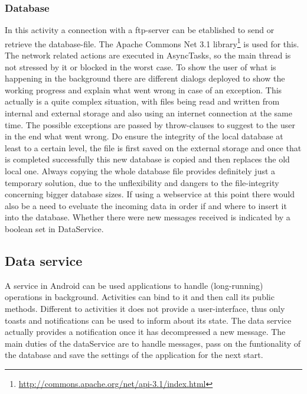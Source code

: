 \documentclass[11pt,oneside,a4paper]{scrartcl}
\begin{document}
\subsubsection{Database}
In this activity a connection with a ftp-server can be etablished to send or retrieve the database-file. The Apache Commons Net 3.1 library\footnote{\url{http://commons.apache.org/net/api-3.1/index.html}} is used for this. The network related actions are executed in AsyncTasks, so the main thread is not stressed by it or blocked in the worst case. To show the user of what is happening in the background there are different dialogs deployed to show the working progress and explain what went wrong in case of an exception. This actually is a quite complex situation, with files being read and written from internal and external storage and also using an internet connection at the same time. The possible exceptions are passed by throw-clauses to suggest to the user in the end what went wrong.
Do ensure the integrity of the local database at least to a certain level, the file is first saved on the external storage and once that is completed successfully this new database is copied and then 
replaces the old local one. Always copying the whole database file provides definitely just a temporary solution, due to the unflexibility and dangers to the file-integrity concerning bigger database sizes.
If using a webservice at this point there would also be a need to eveluate the incoming data in order if and where to insert it into the database. Whether there were new messages received is indicated by a boolean set in DataService.


\subsection{Data service}
A service in Android can be used applications to handle (long-running) operations in background. Activities can bind to it and then call its public methods. Different to activities it does not provide a user-interface, thus only toasts and notifications can be used to inform about its state. The data service actually provides a notification once it has decompressed a new message.
The main duties of the dataService are to handle messages, pass on the funtionality of the database and save the settings of the application for the next start.
\end{document}

